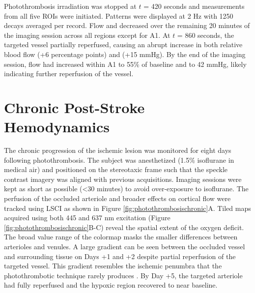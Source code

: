 Photothrombosis irradiation was stopped at $t$ = 420 seconds and  measurements from all five ROIs were initiated. Patterns were displayed at 2 Hz with 1250 decays averaged per record. Flow and  decreased over the remaining 20 minutes of the imaging session across all regions except for A1. At $t$ = 860 seconds, the targeted vessel partially reperfused, causing an abrupt increase in both relative blood flow (+6 percentage points) and  (+15 mmHg). By the end of the imaging session, flow had increased within A1 to 55\% of baseline and  to 42 mmHg, likely indicating further reperfusion of the vessel.



\section{Chronic Post-Stroke Hemodynamics} \label{sec:chronic_hemodynamics}

The chronic progression of the ischemic lesion was monitored for eight days following photothrombosis. The subject was anesthetized (1.5\% isoflurane in medical air) and positioned on the stereotaxic frame such that the speckle contrast imagery was aligned with previous acquisitions. Imaging sessions were kept as short as possible (\textless30 minutes) to avoid over-exposure to isoflurane. The perfusion of the occluded arteriole and broader effects on cortical flow were tracked using LSCI as shown in Figure \ref{fig:photothrombosischronic}A. Tiled  maps acquired using both 445 and 637 nm excitation (Figure \ref{fig:photothrombosischronic}B-C) reveal the spatial extent of the oxygen deficit. The broad value range of the colormap masks the smaller  differences between arterioles and venules. A large gradient can be seen between the occluded vessel and surrounding tissue on Days +1 and +2 despite partial reperfusion of the targeted vessel. This gradient resembles the ischemic penumbra that the photothrombotic technique rarely produces \cite{Carmichael:2005gk}. By Day +5, the targeted arteriole had fully reperfused and the hypoxic region recovered to near baseline.


